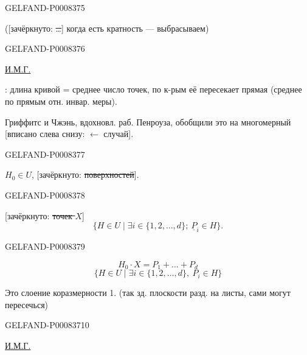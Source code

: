 \begin{GelfandAdjacentEvidence}{GELFAND-P000837}{5}


([зачёркнуто: \sout{…}] когда есть кратность — выбрасываем)
\end{GelfandAdjacentEvidence}
\begin{GelfandAdjacentEvidence}{GELFAND-P000837}{6}


\uline{И.М.Г.}

: длина кривой = среднее число точек, по к-рым её пересекает прямая
(среднее по прямым отн. инвар. меры).

Гриффитс и Чжэнь, вдохновл. раб. Пенроуза, обобщили это на многомерный [вписано слева снизу: \(\leftarrow\) случай].
\end{GelfandAdjacentEvidence}
\begin{GelfandAdjacentEvidence}{GELFAND-P000837}{7}


 \(H_0\in U\), 
[зачёркнуто: \sout{поверхностей}].
\end{GelfandAdjacentEvidence}
\begin{GelfandAdjacentEvidence}{GELFAND-P000837}{8}


[зачёркнуто: \sout{точек \(X\)}] 
\[
\{H\in U\mid \exists i\in\{1,2,\ldots,d\};\ \underline{P}_i\in H\}.
\]
\end{GelfandAdjacentEvidence}
\begin{GelfandAdjacentEvidence}{GELFAND-P000837}{9}

\[
H_0\cdot X=P_1+\ldots+P_d
\]
\begin{equation*}
\{H\in U\mid \exists i\in\{1,2,\ldots,d\},\ P_i\in H\}
\tag{2}
\end{equation*}

Это слоение коразмерности 1. (так зд. плоскости разд. на листы, сами могут пересечься)
\end{GelfandAdjacentEvidence}
\begin{GelfandAdjacentEvidence}{GELFAND-P000837}{10}


\uline{И.М.Г.}
\end{GelfandAdjacentEvidence}
